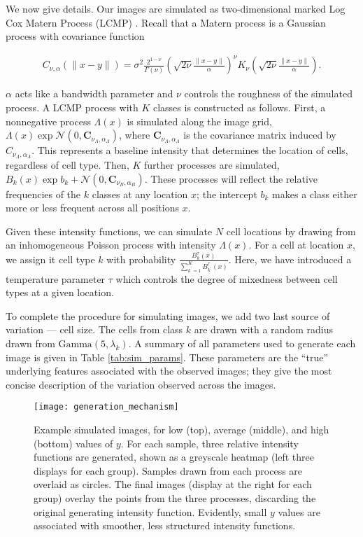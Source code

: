 We now give details. Our images are simulated as two-dimensional marked Log Cox
Matern Process (LCMP) \cite{diggle2013}. Recall that a Matern process is a
Gaussian process with covariance function

\begin{align*}
C_{\nu, \alpha}(\|x - y\|)=\sigma^{2} \frac{2^{1-\nu}}{\Gamma(\nu)}\left(\sqrt{2 \nu} \frac{\|x - y\|}{\alpha}\right)^{\nu} K_{\nu}\left(\sqrt{2 \nu} \frac{\|x - y\|}{\alpha}\right).
\end{align*}

$\alpha$ acts like a bandwidth parameter and $\nu$ controls the roughness of the
simulated process. A LCMP process with $K$ classes is constructed as follows.
First, a nonnegative process $\Lambda\left(x\right)$ is simulated along the
image grid, $\Lambda\left(x\right) \exp{\mathcal{N}\left(0,
  \mathbf{C}_{\nu_{\Lambda}, \alpha_{\Lambda}}\right)}$, where
$\mathbf{C}_{\nu_{\Lambda}, \alpha_{\Lambda}}$ is the covariance matrix induced
by $C_{\nu_{\Lambda}, \alpha_{\Lambda}}$. This represents a baseline intensity
that determines the location of cells, regardless of cell type. Then, $K$
further processes are simulated, $B_{k}\left(x\right) \exp{b_{k} +
  \mathcal{N}\left(0, \mathbf{C}_{\nu_{B}, \alpha_{B}}\right)} $. These
processes will reflect the relative frequencies of the $k$ classes at any
location $x$; the intercept $b_k$ makes a class either more or less frequent
across all positions $x$.

Given these intensity functions, we can simulate $N$ cell locations by drawing
from an inhomogeneous Poisson process with intensity $\Lambda\left(x\right)$.
For a cell at location $x$, we assign it cell type $k$ with probability
$\frac{B_{k}^{\tau}\left(x\right)}{\sum_{k^\prime = 1}^{K}
  B^{\tau}_{k^\prime}\left(x\right)}$. Here, we have introduced a temperature
parameter $\tau$ which controls the degree of mixedness between cell types at a
given location.

To complete the procedure for simulating images, we add two last source of
variation — cell size. The cells from class $k$ are drawn with a random radius
drawn from $\text{Gamma}\left(5, \lambda_{k}\right)$. A summary of all
parameters used to generate each image is given in Table \ref{tab:sim_params}.
These parameters are the ``true'' underlying features associated with the
observed images; they give the most concise description of the variation
observed across the images.

\begin{figure}
  \centering
  \texttt{[image: generation\_mechanism]}
  \caption{Example simulated images, for low (top), average (middle), and high
    (bottom) values of $y$. For each sample, three relative intensity functions
    are generated, shown as a greyscale heatmap (left three displays for each
    group). Samples drawn from each process are overlaid as circles. The final
    images (display at the right for each group) overlay the points from the
    three processes, discarding the original generating intensity function.
    Evidently, small $y$ values are associated with smoother, less structured
    intensity functions.}
  \label{fig:matern_example}
\end{figure}

